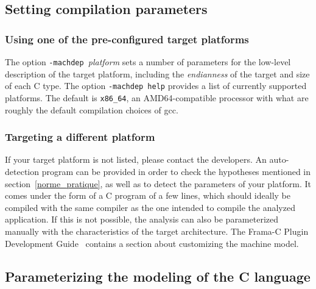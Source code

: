\documentclass{frama-c-book}
\begin{document}

\subsection{Setting compilation parameters} \label{compilation}

\subsubsection{Using one of the pre-configured target platforms}

The option \lstinline|-machdep |{\it platform}
sets a number of parameters for the low-level description of the
target platform, including the
\emph{endianness} of the target and size of each C type.
The option \lstinline|-machdep help| provides a list of currently supported
platforms. The default is \lstinline|x86_64|, an AMD64-compatible processor with
what are roughly the default compilation choices of gcc.

\subsubsection{Targeting a different platform}

If your target platform  is not listed,
please contact the developers.
An auto-detection program can be provided in order to check the hypotheses
mentioned in section~\ref{norme_pratique}, as well as to detect the
parameters of your platform.
It comes under the form of a C program of a few lines, which should ideally be
compiled with the same compiler as the one intended to compile the
analyzed application. If this is not possible, the analysis can also be
parameterized manually with the characteristics of the target
architecture.
The Frama-C Plugin Development Guide~\cite{plugin-dev-guide} contains a
section about customizing the machine model.

\subsection{Parameterizing the modeling of the C language}
\end{document}
